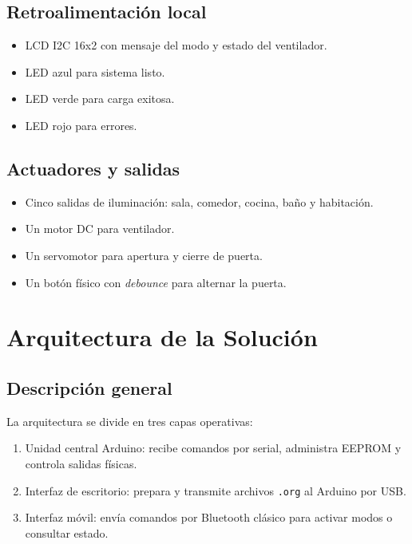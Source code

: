 \documentclass[12pt,a4paper]{article}
\begin{document}
\subsection{Retroalimentación local}
\begin{itemize}[leftmargin=1.2cm]
    \item LCD I2C 16x2 con mensaje del modo y estado del ventilador.
    \item LED azul para sistema listo.
    \item LED verde para carga exitosa.
    \item LED rojo para errores.
\end{itemize}

\subsection{Actuadores y salidas}
\begin{itemize}[leftmargin=1.2cm]
    \item Cinco salidas de iluminación: sala, comedor, cocina, baño y habitación.
    \item Un motor DC para ventilador.
    \item Un servomotor para apertura y cierre de puerta.
    \item Un botón físico con \textit{debounce} para alternar la puerta.
\end{itemize}

\section{Arquitectura de la Solución}

\subsection{Descripción general}
La arquitectura se divide en tres capas operativas:
\begin{enumerate}
    \item Unidad central Arduino: recibe comandos por serial, administra EEPROM y controla salidas físicas.
    \item Interfaz de escritorio: prepara y transmite archivos \texttt{.org} al Arduino por USB.
    \item Interfaz móvil: envía comandos por Bluetooth clásico para activar modos o consultar estado.
\end{enumerate}
\end{document}
